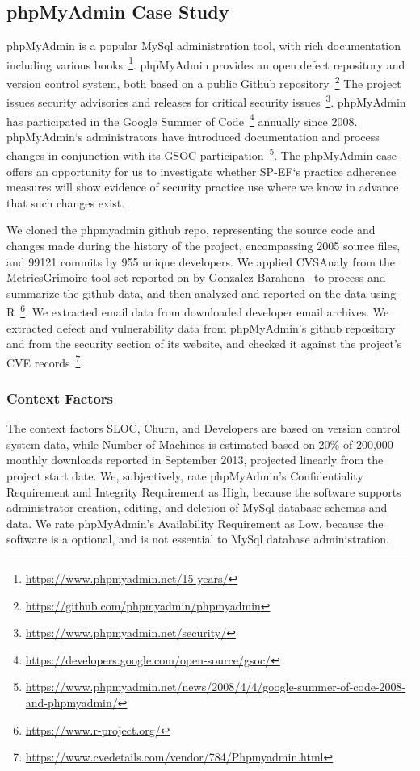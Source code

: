 \subsection{phpMyAdmin Case Study}
\label{sec:case_pma}
	
phpMyAdmin is a popular MySql administration tool, with rich documentation including various books~\footnote{\url{https://www.phpmyadmin.net/15-years/}}. phpMyAdmin provides an open defect repository and version control system, both based on a public Github repository~\footnote{\url{https://github.com/phpmyadmin/phpmyadmin}} The project issues security advisories and releases for critical security issues~\footnote{\url{https://www.phpmyadmin.net/security/}}. 
phpMyAdmin has participated in the Google Summer of Code~\footnote{\url{https://developers.google.com/open-source/gsoc/}} annually since 2008. phpMyAdmin`s administrators have introduced documentation and process changes in conjunction with its GSOC participation~\footnote{\url{https://www.phpmyadmin.net/news/2008/4/4/google-summer-of-code-2008-and-phpmyadmin/}}. The phpMyAdmin case offers an opportunity for us to investigate whether SP-EF`s practice adherence measures will show evidence of security practice use where we know in advance that such changes exist.

We cloned the phpmyadmin github repo, representing the source code and changes made during the history of the project, encompassing 2005 source files, and 99121 commits by 955 unique developers. We applied CVSAnaly from the MetricsGrimoire tool set reported on by Gonzalez-Barahona~\cite{barahona2015metrics} to process and summarize the github data, and then analyzed and reported on the data using R~\footnote{\url{https://www.r-project.org/}}. We extracted email data from downloaded developer email archives. We extracted defect and vulnerability data from phpMyAdmin’s github repository and from the security section of its website, and checked it against the project’s CVE records~\footnote{\url{https://www.cvedetails.com/vendor/784/Phpmyadmin.html}}. 

\subsubsection{Context Factors}

The context factors SLOC, Churn, and Developers are based on version control system data, while Number of Machines is estimated based on 20\% of 200,000 monthly downloads reported in September 2013, projected linearly from the project start date. We, subjectively, rate phpMyAdmin’s Confidentiality Requirement and Integrity Requirement as High, because the software supports administrator creation, editing, and deletion of MySql database schemas and data. We rate phpMyAdmin’s Availability Requirement as Low, because the software is a optional, and is not essential to MySql database administration.

